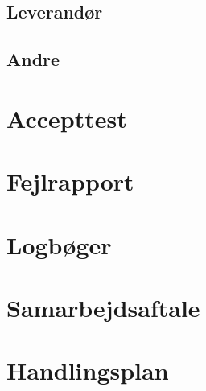 \subsection{Leverandør}
\label{mailleverandor}

\subsection{Andre}
\label{mailAndre}

\section{Accepttest}
\label{bilag:Accepttest}

\section{Fejlrapport}
\label{bilag:Fejlrapport}

\section{Logbøger}
\label{bilag:Logboger}

\section{Samarbejdsaftale}
\label{bilag:samarbejdsaftale}

\section{Handlingsplan}
\label{bilag:Handlingsplan}